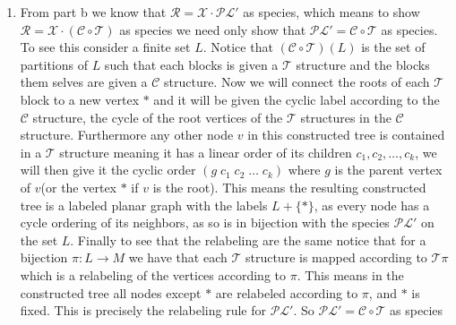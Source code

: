 \documentclass[12pt]{amsart}
\theoremstyle{definition}
\newcommand{\ra}{\rightarrow}
\begin{document}
\begin{itemize}
\begin{enumerate}[label=(\alph*)]
    \item %
    From part b we know that $\mathcal{R}=\mathcal{X}\cdot\mathcal{PL}'$ as species, which means to show $\mathcal{R}=\mathcal{X}\cdot(\mathcal{C}\circ\mathcal{T})$ as species we need only show that $\mathcal{PL}'=\mathcal{C}\circ\mathcal{T}$ as species. To see this consider a finite set $L$. Notice that $(\mathcal{C}\circ\mathcal{T})(L)$ is the set of partitions of $L$ such that each blocks is given a $\mathcal{T}$ structure and the blocks them selves are given a $\mathcal{C}$ structure. Now we will connect the roots of each $\mathcal{T}$ block to a new vertex $*$ and it will be given the cyclic label according to the $\mathcal{C}$ structure, the cycle of the root vertices of the $\mathcal{T}$ structures in the $\mathcal{C}$ structure. Furthermore any other node $v$ in this constructed tree is contained in a $\mathcal{T}$ structure meaning it has a linear order of its children $c_1,c_2,\dots,c_k$, we will then give it the cyclic order $(g\;c_1\;c_2\;\dots\;c_k)$ where $g$ is the parent vertex of $v$(or the vertex $*$ if $v$ is the root). This means the resulting constructed tree is a labeled planar graph with the labels $L+\{*\}$, as every node has a cycle ordering of its neighbors, as so is in bijection with the species $\mathcal{PL}'$ on the set $L$. Finally to see that the relabeling are the same notice that for a bijection $\pi:L\ra M$ we have that each $\mathcal{T}$ structure is mapped according to $\mathcal{T}\pi$ which is a relabeling of the vertices according to $\pi$. This means in the constructed tree all nodes except $*$ are relabeled according to $\pi$, and $*$ is fixed. This is precisely the relabeling rule for $\mathcal{PL}'$. So $\mathcal{PL}'=\mathcal{C}\circ\mathcal{T}$ as species\\


\end{enumerate}
\end{itemize}
\end{document}
